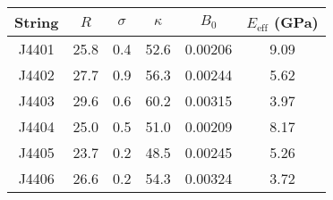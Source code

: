 \begin{tabular}{cccccc}
\toprule
String & $R$ & $\sigma$ & $\kappa$ & $B_0$ & $E_\mathrm{eff}$ (GPa) \\
\midrule
J4401 & 25.8 & 0.4 & 52.6 & 0.00206 & 9.09 \\
J4402 & 27.7 & 0.9 & 56.3 & 0.00244 & 5.62 \\
J4403 & 29.6 & 0.6 & 60.2 & 0.00315 & 3.97 \\
J4404 & 25.0 & 0.5 & 51.0 & 0.00209 & 8.17 \\
J4405 & 23.7 & 0.2 & 48.5 & 0.00245 & 5.26 \\
J4406 & 26.6 & 0.2 & 54.3 & 0.00324 & 3.72 \\
\bottomrule
\end{tabular}

